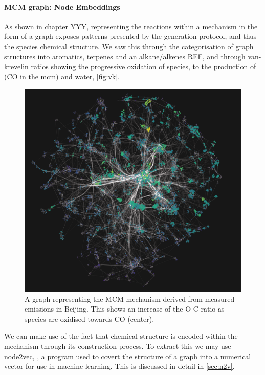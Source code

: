 \paragraph{MCM graph: Node Embeddings}\label{sec:n2vec}

As shown in chapter YYY, representing the reactions within a mechanism in the form of a graph exposes patterns presented by the generation protocol, and thus the species chemical structure. We saw this through the categorisation of graph structures into aromatics, terpenes and an alkane/alkenes REF, and through van-krevelin ratios showing the progressive oxidation of species, to the production of  (CO in the mcm) and water, \autoref{fig:vk}.


\begin{figure}[h]
  \centering
  \includegraphics[width=\textwidth]{4fig/graph/oxidised_ratio.png}
  \caption{A graph representing the MCM mechanism derived from measured emissions in Beijing. This shows an increase of the O-C ratio as species are oxidised towards CO (center).  }
  \label{fig:vk}
\end{figure}


We can make use of the fact that chemical structure is encoded within the mechanism through its construction process. To extract this we may use node2vec, \citep{node2vec}, a program used to covert the structure of a graph into a numerical vector for use in machine learning. This is discussed in detail in  \autoref{sec:n2v}.




